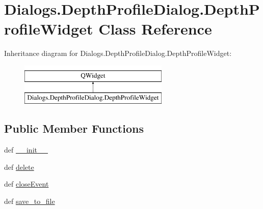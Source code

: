 \hypertarget{classDialogs_1_1DepthProfileDialog_1_1DepthProfileWidget}{\section{Dialogs.\-Depth\-Profile\-Dialog.\-Depth\-Profile\-Widget Class Reference}
\label{classDialogs_1_1DepthProfileDialog_1_1DepthProfileWidget}
}
Inheritance diagram for Dialogs.\-Depth\-Profile\-Dialog.\-Depth\-Profile\-Widget\-:\begin{figure}[H]
\begin{center}
\leavevmode
\includegraphics[height=2.000000cm]{classDialogs_1_1DepthProfileDialog_1_1DepthProfileWidget}
\end{center}
\end{figure}
\subsection*{Public Member Functions}
\begin{DoxyCompactItemize}
\item 
def \hyperlink{classDialogs_1_1DepthProfileDialog_1_1DepthProfileWidget_a6ce1e2fe9a2780398dd1e62f44245e31}{\-\_\-\-\_\-init\-\_\-\-\_\-}
\item 
def \hyperlink{classDialogs_1_1DepthProfileDialog_1_1DepthProfileWidget_ab8d159ad6d502f044900f2f50554e631}{delete}
\item 
def \hyperlink{classDialogs_1_1DepthProfileDialog_1_1DepthProfileWidget_afde62bd6a622e339b46de34dbe6e310f}{close\-Event}
\item 
def \hyperlink{classDialogs_1_1DepthProfileDialog_1_1DepthProfileWidget_a06713c36f62be4f15cdfe1e2baad39bf}{save\-\_\-to\-\_\-file}
\end{DoxyCompactItemize}

